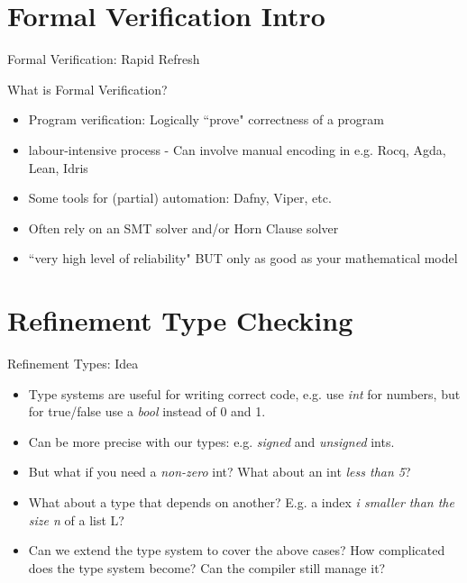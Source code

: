 \documentclass{beamer}
\begin{document}
\section{Formal Verification Intro}
\begin{frame}{Formal Verification: Rapid Refresh}
\begin{block}{What is Formal Verification?}
\begin{itemize} 
	\item Program verification: Logically ``prove" correctness of a program
	\item labour-intensive process - Can involve manual encoding in e.g. Rocq, Agda, Lean, Idris
	\item Some tools for (partial) automation: Dafny, Viper, etc.
	\item Often rely on an SMT solver and/or Horn Clause solver
	\item ``very high level of reliability" BUT only as good as your mathematical model 
\end{itemize} 
\end{block}
\end{frame}

\section{Refinement Type Checking}
\begin{frame}{Refinement Types: Idea}
\begin{itemize}
\item
Type systems are useful for writing correct code, e.g. use \emph{int} for numbers, but for true/false use a \emph{bool} instead of 0 and 1.

\item
Can be more precise with our types: e.g. \emph{signed} and \emph{unsigned} ints. 

\item
But what if you need a \emph{non-zero} int? What about an int \emph{less than 5}? 

\item What about a type that depends on another? E.g. a index \emph{i smaller than the size n} of a list L? 

\item 
Can we extend the type system to cover the above cases? How complicated does the type system become? Can the compiler still manage it? 
\end{itemize}
\end{frame}
\end{document}
